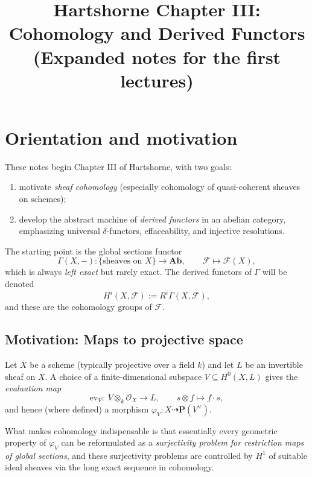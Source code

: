 \documentclass[11pt]{article}
\title{Hartshorne Chapter III: Cohomology and Derived Functors\\
(Expanded notes for the first lectures)}
\author{}
\date{}
\theoremstyle{definition}
\theoremstyle{plain}
\newcommand{\Ab}{\mathbf{Ab}}
\newcommand{\PP}{\mathbf{P}}
\begin{document}
\maketitle


\section{Orientation and motivation}

These notes begin Chapter III of Hartshorne, with two goals:
\begin{enumerate}[label=(\arabic*)]
  \item motivate \emph{sheaf cohomology} (especially cohomology of quasi-coherent sheaves on schemes);
  \item develop the abstract machine of \emph{derived functors} in an abelian category, emphasizing universal $\delta$-functors, effaceability, and injective resolutions.
\end{enumerate}

The starting point is the global sections functor
\[
\Gamma(X,-) : \{\text{sheaves on }X\}\to \Ab,\qquad \mathcal{F}\mapsto \mathcal{F}(X),
\]
which is always \emph{left exact} but rarely exact. The derived functors of $\Gamma$ will be denoted
\[
H^i(X,\mathcal{F}) := R^i\Gamma(X,\mathcal{F}),
\]
and these are the cohomology groups of $\mathcal{F}$.

\subsection{Motivation: Maps to projective space}

Let $X$ be a scheme (typically projective over a field $k$) and let $L$ be an invertible sheaf on $X$.
A choice of a finite-dimensional subspace $V\subseteq H^0(X,L)$ gives the \emph{evaluation map}
\begin{equation}\label{eq:eval}
\mathrm{ev}_V:\; V\otimes_k \mathcal{O}_X \longrightarrow L,\qquad s\otimes f\mapsto f\cdot s,
\end{equation}
and hence (where defined) a morphism $\varphi_V:X\dashrightarrow \PP(V^\vee)$.

What makes cohomology indispensable is that essentially every geometric property of $\varphi_V$ can be reformulated as a \emph{surjectivity problem for restriction maps of global sections}, and these surjectivity problems are controlled by $H^1$ of suitable ideal sheaves via the long exact sequence in cohomology.
\end{document}
